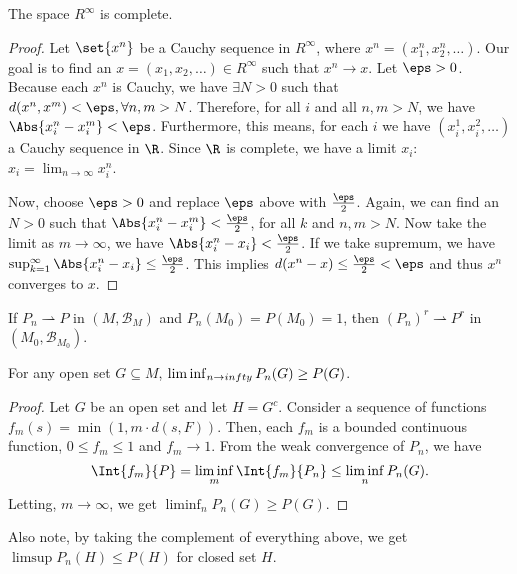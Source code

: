 \documentclass[12pt,letterpaper,twoside]{hmcpset}
\begin{document}
\begin{problem}
  The space $R^\infty$ is complete.
\end{problem}

\begin{solution}
  \begin{proof}
    Let $\set{x^n}$ be a Cauchy sequence in $R^\infty$, where $x^n = (x_1^n, x_2^n, \dotsc)$.
    Our goal is to find an $x = (x_1, x_2, \dotsc) \in R^\infty$ such that $x^n \to x$.
    Let $\eps > 0$.
    Because each $x^n$ is Cauchy, we have $\exists N > 0$ such that $d(x^n,x^m) < \eps, \forall n,m > N$.
    Therefore, for all $i$ and all $n,m > N$, we have $\Abs{x^n_i - x^m_i} < \eps$.
    Furthermore, this means, for each $i$ we have $(x^1_i, x^2_i, \dotsc)$ a Cauchy sequence in $\R$.
    Since $\R$ is complete, we have a limit $x_i$: $x_i = \lim_{n\to\infty}x^n_i$.
    
    Now, choose $\eps > 0$ and replace $\eps$ above with $\frac{\eps}{2}$.
    Again, we can find an $N > 0$ such that $\Abs{x_i^n - x_i^m} < \frac{\eps}{2}$, for all $k$ and $n,m > N$.
    Now take the limit as $m \to \infty$, we have $\Abs{x_i^n - x_i} < \frac{\eps}{2}$.
    If we take supremum, we have $\sup_{k=1}^\infty\Abs{x_i^n - x_i} \leq \frac{\eps}{2}$.
    This implies $d(x^n - x) \leq \frac{\eps}{2} < \eps$ and thus $x^n$ converges to $x$.
    
  \end{proof}
\end{solution}

\begin{problem}
  If $P_n \rightharpoonup P$ in $(M, \mathcal{B}_M)$ and $P_n(M_0) = P(M_0) = 1$, then $(P_n)^r \rightharpoonup P^r$ in $(M_0, \mathcal{B}_{M_0})$.
\end{problem}

\begin{solution}
  \begin{lem}
    \label{lem:1}
    For any open set $G \subseteq M$, $\liminf_{n\to\\infty}P_n(G) \geq P(G)$.
  \end{lem}
  \begin{proof}
    Let $G$ be an open set and let $H = G^c$.
    Consider a sequence of functions $f_m(s) = \min(1,m\cdot d(s,F))$.
    Then, each $f_m$ is a bounded continuous function, $0 \leq f_m \leq 1$ and $f_m \to 1$.
    From the weak convergence of $P_n$, we have \[
    \Int{f_m}{P} = \liminf_m \Int{f_m}{P_n} \leq \liminf_n P_n(G).
    \]
    Letting, $m\to\infty$, we get $\liminf_n P_n(G) \geq P(G)$.
  \end{proof}
  Also note, by taking the complement of everything above, we get $\limsup P_n(H) \leq P(H)$ for closed set $H$.
\end{solution}
\end{document}
